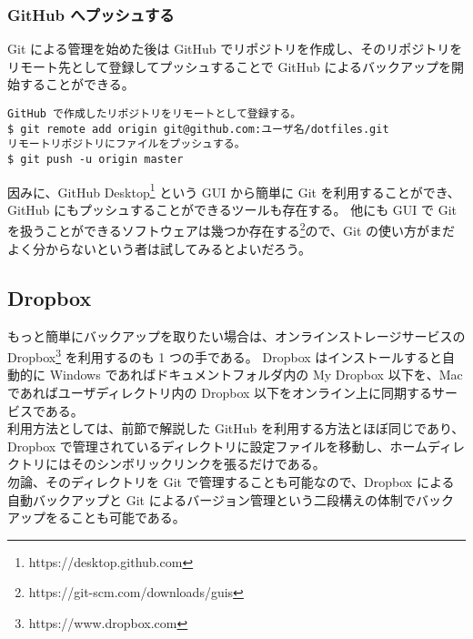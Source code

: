 \subsubsection{GitHub へプッシュする}
Git による管理を始めた後は GitHub でリポジトリを作成し、そのリポジトリをリモート先として登録してプッシュすることで GitHub によるバックアップを開始することができる。
\begin{mdframed}[roundcorner=0.50zw,leftmargin=3.00zw,rightmargin=3.00zw,skipabove=0.40zw,skipbelow=0.40zw,innertopmargin=4.00pt,innerbottommargin=4.00pt,innerleftmargin=5.00pt,innerrightmargin=5.00pt,linecolor=gray!090,linewidth=0.50pt,backgroundcolor=gray!90]\color{gray!10}
\begin{verbatim}
GitHub で作成したリポジトリをリモートとして登録する。
$ git remote add origin git@github.com:ユーザ名/dotfiles.git
リモートリポジトリにファイルをプッシュする。
$ git push -u origin master
\end{verbatim}
\end{mdframed}
因みに、GitHub Desktop\footnote{https://desktop.github.com} という GUI から簡単に Git を利用することができ、GitHub にもプッシュすることができるツールも存在する。
他にも GUI で Git を扱うことができるソフトウェアは幾つか存在する\footnote{https://git-scm.com/downloads/guis}ので、Git の使い方がまだよく分からないという者は試してみるとよいだろう。
\subsection{Dropbox}
もっと簡単にバックアップを取りたい場合は、オンラインストレージサービスの Dropbox\footnote{https://www.dropbox.com} を利用するのも 1 つの手である。
Dropbox はインストールすると自動的に Windows であればドキュメントフォルダ内の My Dropbox 以下を、Mac であればユーザディレクトリ内の Dropbox 以下をオンライン上に同期するサービスである。\\

利用方法としては、前節で解説した GitHub を利用する方法とほぼ同じであり、Dropbox で管理されているディレクトリに設定ファイルを移動し、ホームディレクトリにはそのシンボリックリンクを張るだけである。\\

勿論、そのディレクトリを Git で管理することも可能なので、Dropbox による自動バックアップと Git によるバージョン管理という二段構えの体制でバックアップをることも可能である。
